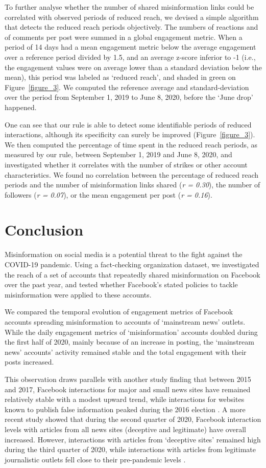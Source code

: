 \documentclass[sigconf]{acmart}
\begin{document}
To further analyse whether the number of shared misinformation links could be correlated with observed periods of reduced reach, we devised a simple algorithm that detects the reduced reach periods objectively. The numbers of reactions and of comments per post were summed in a global engagement metric. When a period of 14 days had a mean engagement metric below the average engagement over a reference period divided by 1.5, and an average z-score inferior to -1 (i.e., the engagement values were on average lower than a standard deviation below the mean), this period was labeled as `reduced reach', and shaded in green on Figure~\ref{figure_3}. We computed the reference average and standard-deviation over the period from September 1, 2019 to June 8, 2020, before the `June drop' happened.

One can see that our rule is able to detect some identifiable periods of reduced interactions, although its specificity can surely be improved (Figure~\ref{figure_3}). We then computed the percentage of time spent in the reduced reach periods, as measured by our rule, between September 1, 2019 and June 8, 2020, and investigated whether it correlates with the number of strikes or other account characteristics. We found no correlation between the percentage of reduced reach periods and the number of misinformation links shared (\textit{r = 0.30}), the number of followers (\textit{r = 0.07}), or the mean engagement per post (\textit{r = 0.16}).

\section{Conclusion}

Misinformation on social media is a potential threat to the fight against the COVID-19 pandemic. Using a fact-checking organization dataset, we investigated the reach of a set of accounts that repeatedly shared misinformation on Facebook over the past year, and tested whether Facebook's stated policies to tackle misinformation were applied to these accounts. 

We compared the temporal evolution of engagement metrics of Facebook accounts spreading misinformation to accounts of `mainstream news' outlets. While the daily engagement metrics of `misinformation' accounts doubled during the first half of 2020, mainly because of an increase in posting, the `mainstream news' accounts' activity remained stable and the total engagement with their posts increased. 

This observation draws parallels with another study finding that between 2015 and 2017, Facebook interactions for major and small news sites have remained relatively stable with a modest upward trend, while interactions for websites known to publish false information peaked during the 2016 election \cite{allcott2019trends}. A more recent study showed that during the second quarter of 2020, Facebook interaction levels with articles from all news sites (deceptive and legitimate) have overall increased. However, interactions with articles from `deceptive sites' remained high during the third quarter of 2020, while interactions with articles from legitimate journalistic outlets fell close to their pre-pandemic levels \cite{KornbluhPandemic}. 
\end{document}
